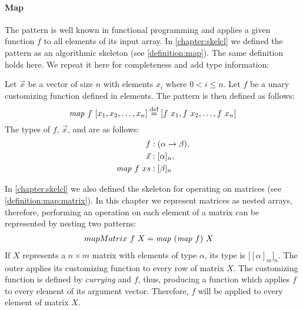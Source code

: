 \paragraph{Map}
The \map pattern is well known in functional programming and applies a given function $f$ to all elements of its input array.
In \autoref{chapter:skelcl} we defined the \map pattern as an algorithmic skeleton (see \autoref{definition:map}).
The same definition holds here.
We repeat it here for completeness and add type information:
\begin{definition}
  \label{definition:patter:map}
  Let $\vec{x}$ be a vector of size $n$ with elements $x_i$ where $0 < i \leq n$.
  Let $f$ be a unary customizing function defined in elements.
  The \map pattern is then defined as follows:
  \begin{equation*}
    \text{\textit{map}}\ f\ [x_1, x_2, \dots, x_n] \stackrel{\textrm{\scriptsize def}}{=} [f\ x_1, f\ x_2, \dots, f\ x_n]
  \end{equation*}
  The types of $f$, $\vec{x}$, and \map are as follows:
  \begin{align*}
    f &: (\alpha \rightarrow \beta),\\
    \vec{x} &: [\alpha]_n,\\
    \text{\textit{map}}\ f\ xs &: [\beta]_n
  \end{align*}
\end{definition}

\noindent
In \autoref{chapter:skelcl} we also defined the \map skeleton for operating on matrices (see \autoref{definition:map:matrix}).
In this chapter we represent matrices as nested arrays, therefore, performing an operation on each element of a matrix can be represented by nesting two \map patterns:
\begin{align*}
  mapMatrix\ f\ X &= \text{\textit{map}}\ (\text{\textit{map}}\ f)\ X
\end{align*}
If $X$ represents a $n\times m$ matrix with elements of type $\alpha$, its type is $\big[[\alpha]_m\big]_n$.
The outer \map applies its customizing function to every row of matrix $X$.
The customizing function is defined by \emph{currying} \map and $f$, thus, producing a function which applies $f$ to every element of its argument vector.
Therefore, $f$ will be applied to every element of matrix $X$.

